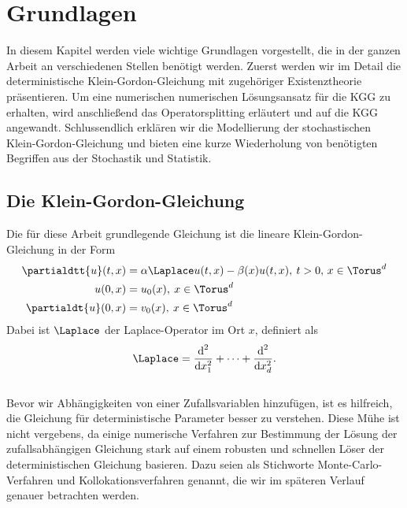 
\chapter{Grundlagen}
\label{Chapter1}
In diesem Kapitel werden viele wichtige Grundlagen vorgestellt, die in der ganzen Arbeit an verschiedenen Stellen benötigt werden. Zuerst werden wir im Detail die deterministische Klein-Gordon-Gleichung mit zugehöriger Existenztheorie präsentieren. Um eine numerischen numerischen Lösungsansatz für die KGG zu erhalten, wird anschließend das Operatorsplitting erläutert und auf die KGG angewandt. Schlussendlich erklären wir die Modellierung der stochastischen Klein-Gordon-Gleichung und bieten eine kurze Wiederholung von benötigten Begriffen aus der Stochastik und Statistik.

\section{Die Klein-Gordon-Gleichung}
Die für diese Arbeit grundlegende Gleichung ist die lineare Klein-Gordon-Gleichung in der Form
\begin{align}
\label{kgg}
\partialdtt{u}(t,x)&=\alpha \Laplace u(t,x) - \beta(x)u(t,x), \: t>0, \, x\in \Torus^d\\
u(0,x)&=u_0(x), \: x\in \Torus^d\\
\partialdt{u}(0,x)&=v_0(x), \: x\in \Torus^d
\end{align}
Dabei ist $\Laplace$ der Laplace-Operator im Ort $x$, definiert als
\[\Laplace=\frac{\text{d}^2}{\text{d}x^2_1}+\dots+\frac{\text{d}^2}{\text{d}x^2_d}.\]\\
Bevor wir Abhängigkeiten von einer Zufallsvariablen hinzufügen, ist es hilfreich, die Gleichung für deterministische Parameter besser zu verstehen. Diese Mühe ist nicht vergebens, da einige numerische Verfahren zur Bestimmung der Lösung der zufallsabhängigen Gleichung stark auf einem robusten und schnellen Löser der deterministischen Gleichung basieren. Dazu seien als Stichworte Monte-Carlo-Verfahren und Kollokationsverfahren genannt, die wir im späteren Verlauf genauer betrachten werden.
